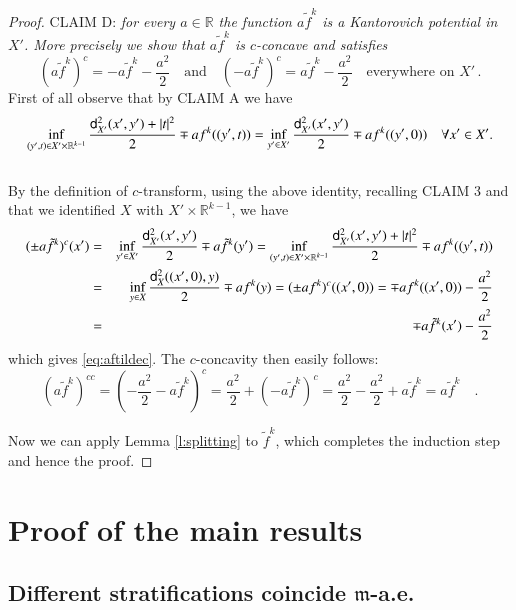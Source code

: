 \documentclass[11pt,reqno]{amsart}
\newcommand{\mm}{\mathfrak m}
\newcommand{\sfd}{{\sf d}}
\newcommand{\R}{\mathbb{R}}
\theoremstyle{definition}
\theoremstyle{remark}
\theoremstyle{remark}
\theoremstyle{remark}
\theoremstyle{remark}
\theoremstyle{remark}
\theoremstyle{remark}
\theoremstyle{remark}
\begin{document}
\begin{proof}
CLAIM D: \emph{for every $a\in \R$ the function $a\tilde{f}^k$ is  a Kantorovich potential in $X'$. More precisely we show that $a\tilde{f}^k$ is $c$-concave and satisfies} 
\begin{equation}\label{eq:aftildec}
(a\tilde{f}^k)^c = -a \tilde{f}^k- \frac{a^2}{2} \quad \text{and} \quad (-a\tilde{f}^k)^c=a \tilde{f}^k -\frac{a^2}{2} \quad\text{everywhere on }X' \, .
\end{equation}
First of all observe that by CLAIM A we have 
$$\inf_{(y',t)\in X'\times \R^{k-1}} \frac{\sfd_{X'}^2(x',y')+|t|^2}{2}\mp a f^k((y',t))= \inf_{y'\in X'} \frac{\sfd_{X'}^2(x',y')}{2} \mp a f^k((y',0)) \quad \forall x' \in X'. $$
\\By the definition of $c$-transform, using  the  above identity,  recalling CLAIM 3 and  that we identified $X$ with $X'\times \R^{k-1}$, we have
\begin{eqnarray}
(\pm a \tilde{f}^k)^c(x')&=&\inf_{y' \in X'} \frac{\sfd^2_{X'}(x',y')}{2}\mp a \tilde{f}^k(y') =  \inf_{(y',t)\in X'\times \R^{k-1}} \frac{\sfd_{X'}^2(x',y')+|t|^2}{2}\mp a f^k((y',t)) \nonumber \\
&=& \inf_{y \in X} \frac{\sfd^2_X((x',0),y)}{2}\mp a f^k(y)= (\pm a f^k)^c((x',0))=\mp a f^k((x',0))-\frac{a^2}{2}\nonumber\\
&=&\mp a \tilde{f}^k(x')-\frac{a^2}{2} \nonumber 
\end{eqnarray}
which gives  \eqref{eq:aftildec}. The $c$-concavity then easily follows:
$$(a \tilde{f}^k)^{cc}=\left(-\frac{a^2}{2}- a \tilde{f}^k\right)^c=\frac{a^2}{2}+(- a \tilde{f}^k)^c=\frac{a^2}{2}- \frac{a^2}{2}+ a \tilde{f}^k= a \tilde{f}^k\quad.$$

Now we can apply Lemma \ref{l:splitting} to $\tilde f^k$, which completes the induction step and hence the proof.
\end{proof}

\section{Proof of the main results} \label{Sec:MainRes}

\subsection{Different stratifications coincide $\mm$-a.e.}\label{SS:Strat}
\end{document}

